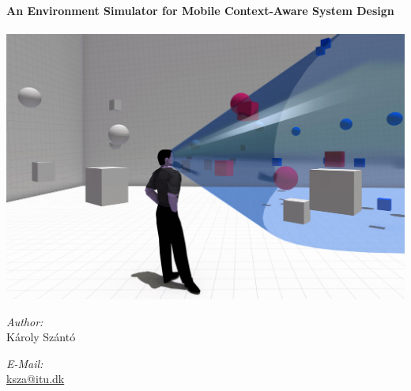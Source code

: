 \begin{titlepage}

\begin{center}


\HRule \\[0.4cm]
{ \huge \bfseries An Environment Simulator for Mobile Context-Aware System Design}\\[0.4cm]

\HRule \\[1.5cm]

\includegraphics[width=\textwidth]{gfx/egosim_logo_small}\\[3cm]    

\begin{minipage}{0.4\textwidth}
\begin{flushleft} \large
\emph{Author:}\\
K\'aroly Sz\'ant\'o\\
\end{flushleft}
\end{minipage}
\begin{minipage}{0.4\textwidth}
\begin{flushright} \large
\emph{E-Mail:} \\
\href{mailto:ksza@itu.dk}{ksza@itu.dk}\\
\end{flushright}
\end{minipage}\\[0.8cm]


\end{center}
\end{titlepage}
